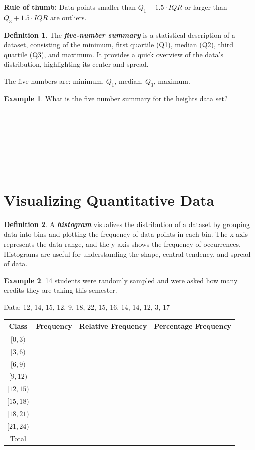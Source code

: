 \documentclass[
  11pt,
  oneside]{book}
\theoremstyle{definition}
\newtheorem{definition}{Definition}[chapter]
\theoremstyle{definition}
\newtheorem{example}{Example}[chapter]
\theoremstyle{definition}
\theoremstyle{definition}
\theoremstyle{remark}
\begin{document}
\textbf{Rule of thumb:} Data points smaller than \(Q_1 - 1.5 \cdot IQR\) or larger than \(Q_3 + 1.5 \cdot IQR\) are outliers.

\begin{definition}
The \textbf{\emph{five-number summary}} is a statistical description of a dataset, consisting of the minimum, first quartile (Q1), median (Q2), third quartile (Q3), and maximum. It provides a quick overview of the data's distribution, highlighting its center and spread.
\end{definition}

The five numbers are: minimum, \(Q_1\), median, \(Q_3\), maximum.

\begin{example}
What is the five number summary for the heights data set?
\end{example}

\(~\)

\(~\)

\(~\)

\(~\)

\newpage

\section{Visualizing Quantitative Data}\label{visualizing-quantitative-data}

\begin{definition}
A \textbf{\emph{histogram}} visualizes the distribution of a dataset by grouping data into bins and plotting the frequency of data points in each bin. The x-axis represents the data range, and the y-axis shows the frequency of occurrences. Histograms are useful for understanding the shape, central tendency, and spread of data.
\end{definition}

\begin{example}
14 students were randomly sampled and were asked how many credits they are taking this semester.

Data: 12, 14, 15, 12, 9, 18, 22, 15, 16, 14, 14, 12, 3, 17
\end{example}

\begin{table}[!h]
\centering
\begin{tabular}{c|c|c|c}
\hline
Class & Frequency & Relative Frequency & Percentage Frequency\\
\hline
$[0,3)$ &  &  & \\
\hline
$[3,6)$ &  &  & \\
\hline
$[6,9)$ &  &  & \\
\hline
$[9,12)$ &  &  & \\
\hline
$[12,15)$ &  &  & \\
\hline
$[15,18)$ &  &  & \\
\hline
$[18,21)$ &  &  & \\
\hline
$[21,24)$ &  &  & \\
\hline
Total &  &  & \\
\hline
\end{tabular}
\end{table}
\end{document}
